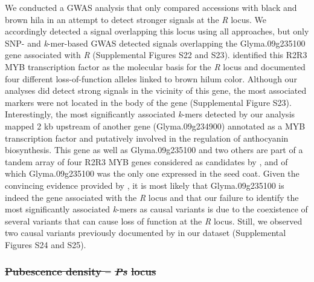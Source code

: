 \documentclass{article}
\providecommand{\DIFaddtex}[1]{{\protect\color{blue}\uwave{#1}}} %
\providecommand{\DIFdeltex}[1]{{\protect\color{red}\sout{#1}}}                      %
\providecommand{\DIFaddbegin}{} %
\providecommand{\DIFaddend}{} %
\providecommand{\DIFdelbegin}{} %
\providecommand{\DIFdelend}{} %
\providecommand{\DIFadd}[1]{\texorpdfstring{\DIFaddtex{#1}}{#1}} %
\providecommand{\DIFdel}[1]{\texorpdfstring{\DIFdeltex{#1}}{}} %
\newcommand{\DIFscaledelfig}{0.5}
\newlength{\DIFdelgraphicswidth} %
\newlength{\DIFdelgraphicsheight} %
\newcommand{\DIFaddincludegraphics}[2][]{{\color{blue}\fbox{\DIFOincludegraphics[#1]{#2}}}} %
\newcommand{\DIFdelincludegraphics}[2][]{%
\sbox{\DIFdelgraphicsbox}{\DIFOincludegraphics[#1]{#2}}%
\settoboxwidth{\DIFdelgraphicswidth}{\DIFdelgraphicsbox} %
\settoboxtotalheight{\DIFdelgraphicsheight}{\DIFdelgraphicsbox} %
\scalebox{\DIFscaledelfig}{%
\parbox[b]{\DIFdelgraphicswidth}{\usebox{\DIFdelgraphicsbox}\\[-\baselineskip] \rule{\DIFdelgraphicswidth}{0em}}\llap{\resizebox{\DIFdelgraphicswidth}{\DIFdelgraphicsheight}{%
\setlength{\unitlength}{\DIFdelgraphicswidth}%
\begin{picture}(1,1)%
\thicklines\linethickness{2pt} %
{\color[rgb]{1,0,0}\put(0,0){\framebox(1,1){}}}%
{\color[rgb]{1,0,0}\put(0,0){\line( 1,1){1}}}%
{\color[rgb]{1,0,0}\put(0,1){\line(1,-1){1}}}%
\end{picture}%
}\hspace*{3pt}}} %
} %
\DeclareRobustCommand{\DIFaddbegin}{\DIFOaddbegin \let\includegraphics\DIFaddincludegraphics} %
\DeclareRobustCommand{\DIFaddend}{\DIFOaddend \let\includegraphics\DIFOincludegraphics} %
\DeclareRobustCommand{\DIFdelbegin}{\DIFOdelbegin \let\includegraphics\DIFdelincludegraphics} %
\DeclareRobustCommand{\DIFdelend}{\DIFOaddend \let\includegraphics\DIFOincludegraphics} %
\begin{document}
We conducted a GWAS analysis that only compared accessions with black and brown
hila in an attempt to detect stronger signals at the \textit{R} locus.  We
accordingly detected a signal overlapping this locus using all approaches, but
only SNP- and \textit{k}-mer-based GWAS detected signals overlapping the
Glyma.09g235100 gene associated with \textit{R} (Supplemental Figures
S22 and S23).
 identified this R2R3 MYB transcription factor as the
molecular basis for the \textit{R} locus and documented four different
loss-of-function alleles linked to brown hilum color. Although our analyses did
detect strong signals in the vicinity of this gene, the most associated markers
were not located in the body of the gene (Supplemental Figure
S23).  Interestingly, the most significantly
associated \emph{k}-mers detected by our analysis mapped 2 kb upstream of
another gene (Glyma.09g234900) annotated as a MYB transcription factor and
putatively involved in the regulation of anthocyanin biosynthesis. This gene as
well as Glyma.09g235100 and two others are part of a tandem array of four R2R3
MYB genes considered as candidates by , and of which
Glyma.09g235100 was the only one expressed in the seed coat. Given the
convincing evidence provided by , it is most likely that
Glyma.09g235100 is indeed the gene associated with the \emph{R} locus and that
our failure to identify the most significantly associated \emph{k}-mers as
causal variants is due to the coexistence of several variants that can cause
loss of function at the \emph{R} locus.  Still, we observed two causal variants
previously documented by  in our dataset (Supplemental Figures
S24 and S25). 

\DIFdelbegin \subsubsection*{\DIFdel{Pubescence density -- }\textit{\DIFdel{Ps}} %
\DIFdel{locus}}
\DIFdelend \DIFaddbegin \subsubsection{\DIFadd{Pubescence density -- }\textit{\DIFadd{Ps}} \DIFadd{locus}}
\DIFaddend 
\end{document}
